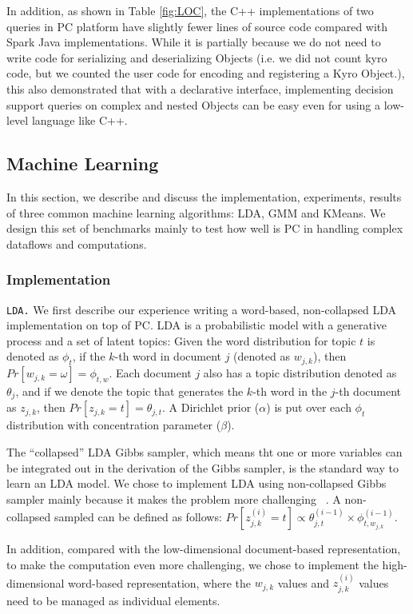 In addition, as shown in Table \ref{fig:LOC}, the C++ implementations of two queries in
PC platform have slightly fewer lines of source code compared with
Spark Java implementations. While it is partially because we do not
need to write code for serializing and deserializing Objects (i.e. we did not
count kyro code, but we counted the user code for encoding and
registering a Kyro Object.), this also demonstrated that with a
declarative interface, implementing decision support
queries on complex and nested Objects can be easy even for using a low-level language like C++.

\subsection {Machine Learning}
In this section, we describe and discuss the implementation,
experiments, results of three common machine learning algorithms: LDA,
GMM and KMeans. We design this set of benchmarks mainly to test how
well is PC in handling complex dataflows and computations.

\subsubsection {Implementation}
\noindent
\texttt {LDA.} We first describe our experience writing a word-based,
non-collapsed LDA implementation \cite{jermaineExperimental} on top of
PC.  LDA is a probabilistic model with a generative process and a set
of latent topics: Given the word distribution for topic $t$ is denoted
as $\phi_{t}$, if the
$k$-th word in document $j$ (denoted as $w_{j,k}$), then
$Pr[w_{j,k}=\omega]=\phi_{t,w}$. Each document $j$ also has a topic
distribution denoted as $\theta_j$, and if we denote the topic that
generates the $k$-th word in the $j$-th document as $z_{j,k}$, then
$Pr[z_{j,k}=t]=\theta_{j,t}$. A Dirichlet prior ($\alpha$) is
put over each $\phi_{t}$ distribution with concentration parameter
($\beta$).

The
``collapsed'' LDA Gibbs sampler, which means tht one or more variables
can be integrated out in the derivation of the Gibbs sampler, is the
standard way to learn an LDA model. We chose to implement
LDA using non-collapsed Gibbs sampler mainly because it makes the
problem more challenging ~\cite{jermaineExperimental}.  A
non-collapsed sampled can be defined as follows:
$Pr[z_{j,k}^{(i)}=t] \propto \theta_{j,t}^{(i-1)} \times \phi_{t, w_{j,k}}^{(i-1)}$.


In addition,
compared with the low-dimensional document-based representation, to
make the computation even more challenging, we
chose to implement the high-dimensional word-based representation,
where the $w_{j,k}$ values and $z_{j,k}^{(i)}$ values need to be managed as
individual elements. 

